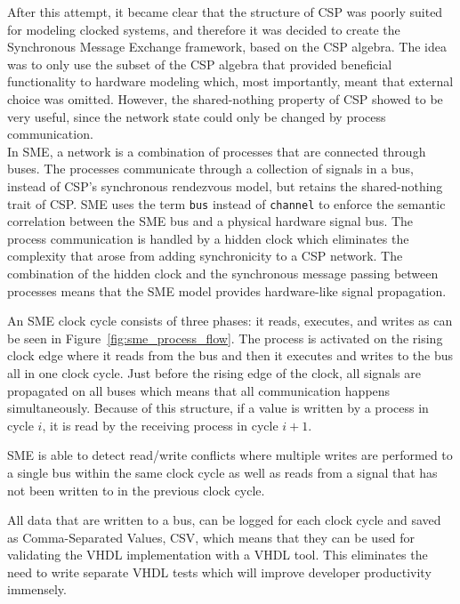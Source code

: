 After this attempt, it became clear that the structure of CSP was poorly suited for modeling clocked systems, and therefore it was decided to create the Synchronous Message Exchange framework, based on the CSP algebra. The idea was to only use the subset of the CSP algebra that provided beneficial functionality to hardware modeling which, most importantly, meant that external choice was omitted. However, the shared-nothing property of CSP showed to be very useful, since the network state could only be changed by process communication.
\\

In SME, a network is a combination of processes that are connected through buses. The processes communicate through a collection of signals in a bus, instead of CSP's synchronous rendezvous model, but retains the shared-nothing trait of CSP.
SME uses the term \texttt{bus} instead of \texttt{channel} to enforce the semantic correlation between the SME bus and a physical hardware signal bus.
The process communication is handled by a hidden clock which eliminates the complexity that arose from adding synchronicity to a CSP network. The combination of the hidden clock and the synchronous message passing between processes means that the SME model provides hardware-like signal propagation.

An SME clock cycle consists of three phases: it reads, executes, and writes as can be seen in Figure~\ref{fig:sme_process_flow}. The process is activated on the rising clock edge where it reads from the bus and then it executes and writes to the bus all in one clock cycle. Just before the rising edge of the clock, all signals are propagated on all buses which means that all communication happens simultaneously. Because of this structure, if a value is written by a process in cycle $i$, it is read by the receiving process in cycle $i+1$.

SME is able to detect read/write conflicts where multiple writes are performed to a single bus within the same clock cycle as well as reads from a signal that has not been written to in the previous clock cycle.

All data that are written to a bus, can be logged for each clock cycle and saved as Comma-Separated Values, CSV, which means that they can be used for validating the VHDL implementation with a VHDL tool. This eliminates the need to write separate VHDL tests which will improve developer productivity immensely.

